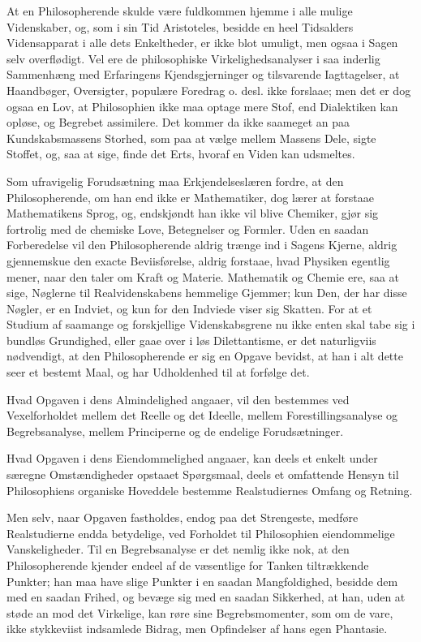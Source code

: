 \documentclass[12pt]{book}
\newcommand{\opage}[1]{\marginnote{\footnotesize\textit{[#1]}}}
\begin{document}
At en Philosopherende skulde være fuldkommen hjemme i alle mulige Videnskaber, og, som i sin
Tid Aristoteles, besidde en heel Tidsalders Vidensapparat i alle dets Enkeltheder, er ikke
blot umuligt, men ogsaa i Sagen selv overflødigt. Vel ere de philosophiske
Virkelighedsanalyser i saa inderlig Sammenhæng med Erfaringens Kjendsgjerninger og
tilsvarende Iagttagelser, at Haandbøger, Oversigter, populære Foredrag o. desl. ikke
forslaae; men det er dog ogsaa en Lov, at Philosophien ikke maa optage mere Stof, end
Dialektiken kan opløse, og Begrebet assimilere. Det kommer da ikke saameget an paa
Kundskabsmassens Storhed, som paa at vælge mellem Massens Dele, sigte Stoffet, og, saa at
sige, finde det Erts, hvoraf en Viden kan udsmeltes.

Som ufravigelig Forudsætning maa Erkjendelseslæren fordre, at den Philosopherende, om han
end ikke er Mathematiker, dog lærer at forstaae Mathematikens Sprog, og, endskjøndt han ikke
vil blive Chemiker, gjør sig fortrolig med de chemiske Love, Betegnelser og Formler. Uden en
saadan Forberedelse vil den Philosopherende aldrig trænge ind i Sagens Kjerne, aldrig
gjennemskue den exacte Beviisførelse, aldrig forstaae, hvad Physiken egentlig mener, naar
den taler om Kraft og Materie. Mathematik og Chemie ere, saa at sige, Nøglerne til
Realvidenskabens hemmelige Gjemmer; kun Den, der har disse Nøgler, er en Indviet, og kun for
den Indviede viser sig Skatten.
\opage{105} For at et Studium af saamange og forskjellige Videnskabsgrene nu ikke enten skal tabe sig i
bundløs Grundighed, eller gaae over i løs Dilettantisme, er det naturligviis nødvendigt, at
den Philosopherende er sig en Opgave bevidst, at han i alt dette seer et bestemt Maal, og
har Udholdenhed til at forfølge det.

Hvad Opgaven i dens Almindelighed angaaer, vil den bestemmes ved Vexelforholdet mellem det
Reelle og det Ideelle, mellem Forestillingsanalyse og Begrebsanalyse, mellem Principerne og
de endelige Forudsætninger.

Hvad Opgaven i dens Eiendommelighed angaaer, kan deels et enkelt under særegne
Omstændigheder opstaaet Spørgsmaal, deels et omfattende Hensyn til Philosophiens organiske
Hoveddele bestemme Realstudiernes Omfang og Retning.

Men selv, naar Opgaven fastholdes, endog paa det Strengeste, medføre Realstudierne endda
betydelige, ved Forholdet til Philosophien eiendommelige Vanskeligheder. Til en
Begrebsanalyse er det nemlig ikke nok, at den Philosopherende kjender endeel af de
væsentlige for Tanken tiltrækkende Punkter; han maa have slige Punkter i en saadan
Mangfoldighed, besidde dem med en saadan Frihed, og bevæge sig med en saadan Sikkerhed, at
han, uden at støde an mod det Virkelige, kan røre sine Begrebsmomenter, som om de vare, ikke
stykkeviist indsamlede Bidrag, men Opfindelser af hans egen Phantasie.
\end{document}
